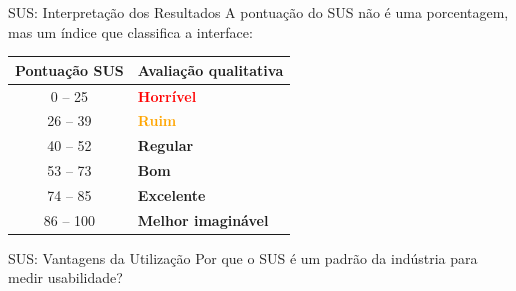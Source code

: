 \documentclass[aspectratio=169]{beamer}
\begin{document}
\begin{frame}{SUS: Interpretação dos Resultados}
    A pontuação do SUS não é uma porcentagem, mas um índice que classifica a interface:
    \vspace{0.3cm}
    \begin{center}
        \renewcommand{\arraystretch}{1.2}
        \begin{tabular}{c | l}
            \hline
            \textbf{Pontuação SUS} & \textbf{Avaliação qualitativa} \\
            \hline
            0 -- 25 & \textcolor{red}{\textbf{Horrível}} \\
            26 -- 39 & \textcolor{orange}{\textbf{Ruim}} \\
            40 -- 52 & \textcolor{yellow!80!black}{\textbf{Regular}} \\
            53 -- 73 & \textcolor{meuverde}{\textbf{Bom}} \\
            74 -- 85 & \textcolor{meuazul}{\textbf{Excelente}} \\
            86 -- 100 & \textbf{Melhor imaginável} \\
            \hline
        \end{tabular}
    \end{center}
\end{frame}

\begin{frame}{SUS: Vantagens da Utilização}
    Por que o SUS é um padrão da indústria para medir usabilidade?
    \vspace{0.8cm}
    \begin{center}
    \end{center}
\end{frame}
\end{document}
